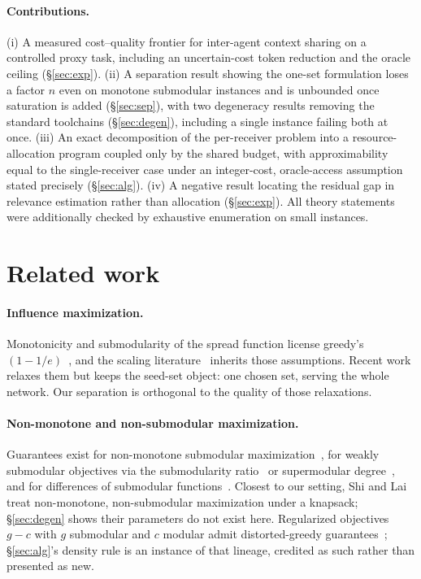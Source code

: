 \documentclass[sigconf,anonymous]{aamas}
\theoremstyle{remark}
\begin{document}
\paragraph{Contributions.} (i) A measured cost--quality frontier for
inter-agent context sharing on a controlled proxy task, including an
uncertain-cost token reduction and the oracle ceiling
(\S\ref{sec:exp}). (ii) A separation result showing the one-set
formulation loses a factor $n$ even on monotone submodular instances
and is unbounded once saturation is added (\S\ref{sec:sep}), with two
degeneracy results removing the standard toolchains
(\S\ref{sec:degen}), including a single instance failing both at once.
(iii) An exact decomposition of the per-receiver problem into a
resource-allocation program coupled only by the shared budget, with
approximability equal to the single-receiver case under an
integer-cost, oracle-access assumption stated precisely
(\S\ref{sec:alg}). (iv) A negative result locating the residual gap in
relevance estimation rather than allocation (\S\ref{sec:exp}). All
theory statements were additionally checked by exhaustive enumeration
on small instances.

\section{Related work}

\paragraph{Influence maximization.} Monotonicity and submodularity of
the spread function license greedy's $(1-1/e)$~\cite{kempe2003}, and
the scaling literature~\cite{borgs2014,tang2015,eim2025} inherits those
assumptions. Recent work relaxes them but keeps the seed-set object:
one chosen set, serving the whole network. Our separation is orthogonal
to the quality of those relaxations.

\paragraph{Non-monotone and non-submodular maximization.} Guarantees
exist for non-monotone submodular
maximization~\cite{feige2011,buchbinder2012}, for weakly submodular
objectives via the submodularity
ratio~\cite{daskempe2011,daskempe2018} or supermodular
degree~\cite{feigeizsak2013}, and for differences of submodular
functions~\cite{iyerbilmes2012}. Closest to our setting, Shi and
Lai~\cite{shilai2024} treat non-monotone, non-submodular maximization
under a knapsack; \S\ref{sec:degen} shows their parameters do not exist
here. Regularized objectives $g-c$ with $g$ submodular and $c$ modular
admit distorted-greedy guarantees~\cite{harshaw2019}; \S\ref{sec:alg}'s
density rule is an instance of that lineage, credited as such rather
than presented as new.
\end{document}
